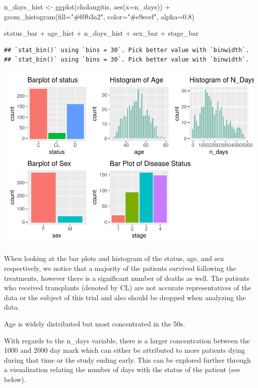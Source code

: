 \documentclass[
]{article}
\newenvironment{Shaded}{\begin{snugshade}}{\end{snugshade}}
\newcommand{\AttributeTok}[1]{\textcolor[rgb]{0.77,0.63,0.00}{#1}}
\newcommand{\FloatTok}[1]{\textcolor[rgb]{0.00,0.00,0.81}{#1}}
\newcommand{\FunctionTok}[1]{\textcolor[rgb]{0.00,0.00,0.00}{#1}}
\newcommand{\NormalTok}[1]{#1}
\newcommand{\OtherTok}[1]{\textcolor[rgb]{0.56,0.35,0.01}{#1}}
\newcommand{\SpecialCharTok}[1]{\textcolor[rgb]{0.00,0.00,0.00}{#1}}
\newcommand{\StringTok}[1]{\textcolor[rgb]{0.31,0.60,0.02}{#1}}
\begin{document}
\begin{Shaded}
\begin{Highlighting}[]
\NormalTok{n\_days\_hist }\OtherTok{\textless{}{-}} \FunctionTok{ggplot}\NormalTok{(cholangitis, }\FunctionTok{aes}\NormalTok{(}\AttributeTok{x=}\NormalTok{n\_days)) }\SpecialCharTok{+}
  \FunctionTok{geom\_histogram}\NormalTok{(}\AttributeTok{fill=}\StringTok{"\#69b3a2"}\NormalTok{, }\AttributeTok{color=}\StringTok{"\#e9ecef"}\NormalTok{, }\AttributeTok{alpha=}\FloatTok{0.8}\NormalTok{)}

\NormalTok{status\_bar }\SpecialCharTok{+}\NormalTok{ age\_hist }\SpecialCharTok{+}\NormalTok{ n\_days\_hist }\SpecialCharTok{+}\NormalTok{ sex\_bar }\SpecialCharTok{+}\NormalTok{ stage\_bar}
\end{Highlighting}
\end{Shaded}

\begin{verbatim}
## `stat_bin()` using `bins = 30`. Pick better value with `binwidth`.
## `stat_bin()` using `bins = 30`. Pick better value with `binwidth`.
\end{verbatim}

\includegraphics{final_proj_files/figure-latex/status histogram-1.pdf}

When looking at the bar plots and histogram of the status, age, and sex
respectively, we notice that a majority of the patients survived
following the treatments, however there is a significant number of
deaths as well. The patients who received transplants (denoted by CL)
are not accurate representatives of the data or the subject of this
trial and also should be dropped when analyzing the data.

Age is widely distributed but most concentrated in the 50s.

With regards to the n\_days variable, there is a larger concentration
between the 1000 and 2000 day mark which can either be attributed to
more patients dying during that time or the study ending early. This can
be explored further through a visualization relating the number of days
with the status of the patient (see below).
\end{document}
